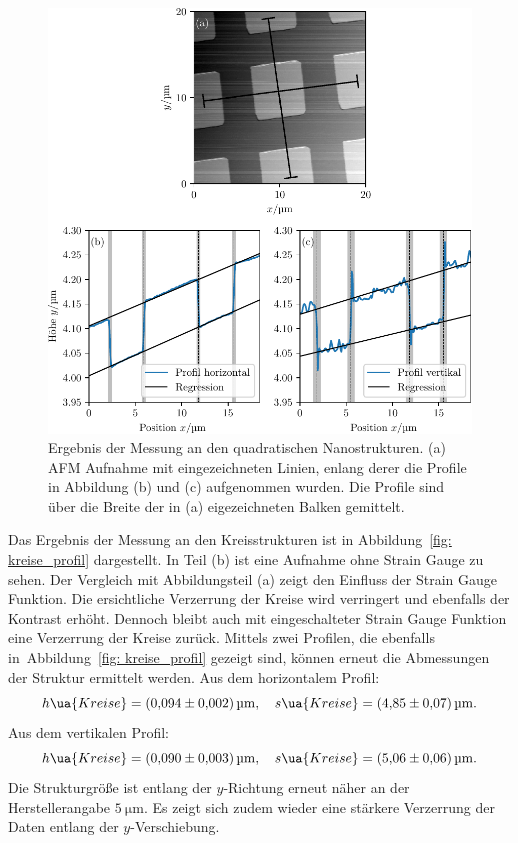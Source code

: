 \begin{figure}
  \centering
  \includegraphics[scale = 1]{../analysis/data/nanostruktur_quadrate/quadrate_profile.pdf}
  \caption{Ergebnis der Messung an den quadratischen Nanostrukturen. (a) AFM Aufnahme mit eingezeichneten
  Linien, enlang derer die Profile in Abbildung (b) und (c) aufgenommen wurden. Die Profile sind
  über die Breite der in (a) eigezeichneten Balken gemittelt.}
  \label{fig: quadrate_profil}
\end{figure}

Das Ergebnis der Messung an den Kreisstrukturen ist in Abbildung~\ref{fig: kreise_profil} dargestellt. In Teil (b)
ist eine Aufnahme ohne Strain Gauge zu sehen. Der Vergleich mit Abbildungsteil (a) zeigt den Einfluss der Strain Gauge Funktion.
Die ersichtliche Verzerrung der Kreise wird verringert und ebenfalls der Kontrast erhöht. Dennoch bleibt auch mit eingeschalteter
Strain Gauge Funktion eine Verzerrung der Kreise zurück. Mittels zwei Profilen, die ebenfalls in~Abbildung~\ref{fig: kreise_profil}
gezeigt sind, können erneut die Abmessungen der Struktur ermittelt werden. Aus dem horizontalem Profil:
\begin{equation}
  h\ua{Kreise} = \SI{0.094(2)}{\micro\meter}, \quad s\ua{Kreise} = \SI{4.85(7)}{\micro\meter}.
\end{equation}
Aus dem vertikalen Profil:
\begin{equation}
  h\ua{Kreise} = \SI{0.090(3)}{\micro\meter}, \quad s\ua{Kreise} = \SI{5.06(6)}{\micro\meter}.
\end{equation}
Die Strukturgröße ist entlang der $y$-Richtung erneut näher an der Herstellerangabe $\SI{5}{\micro\meter}$.
Es zeigt sich zudem wieder eine stärkere Verzerrung der Daten entlang der $y$-Verschiebung.

